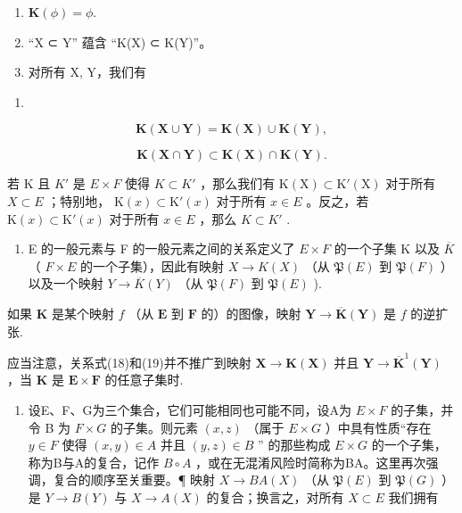 \begin{enumerate}
\def\labelenumi{(\alph{enumi})}
\item
  \(\mathbf{K}(\phi)=\phi.\)
\item
  “X ⊂ Y” 蕴含 “K(X) ⊂ K(Y)”。
\item
  对所有 X, Y，我们有
\end{enumerate}

\begin{enumerate}
\def\labelenumi{(\arabic{enumi})}
\setcounter{enumi}{27}
\tightlist
\item
\end{enumerate}

\[
\mathbf {K} (\mathbf {X} \cup \mathbf {Y}) = \mathbf {K} (\mathbf {X}) \cup \mathbf {K} (\mathbf {Y}),\tag{29}
\]

\[
\mathbf {K} (\mathbf {X} \cap \mathbf {Y}) \subset \mathbf {K} (\mathbf {X}) \cap \mathbf {K} (\mathbf {Y}).
\]

若 K 且 \(K'\) 是 \(E \times F\) 使得 \(K \subset K'\) ，那么我们有 \(\mathrm{K}(\mathrm{X}) \subset \mathrm{K}'(\mathrm{X})\) 对于所有 \(X \subset E\) ；特别地， \(\mathrm{K}(x) \subset \mathrm{K}'(x)\) 对于所有 \(x \in E\) 。反之，若 \(\mathrm{K}(x) \subset \mathrm{K}'(x)\) 对于所有 \(x \in E\) ，那么 \(K \subset K'\) .

\begin{enumerate}
\def\labelenumi{\arabic{enumi}.}
\setcounter{enumi}{8}
\tightlist
\item
  E 的一般元素与 F 的一般元素之间的关系定义了 \(E \times F\) 的一个子集 K 以及 \(\overline{K}\) （ \(F \times E\) 的一个子集），因此有映射 \(X \to K(X)\) （从 \(\mathfrak{P}(E)\) 到 \(\mathfrak{P}(F)\) ）以及一个映射 \(Y \to \overline{K}(Y)\) （从 \(\mathfrak{P}(F)\) 到 \(\mathfrak{P}(E)\) ).
\end{enumerate}

如果 \(\mathbf{K}\) 是某个映射 \(f\) （从 \(\mathbf{E}\) 到 \(\mathbf{F}\) 的）的图像，映射 \(\mathbf{Y} \to \overline{\mathbf{K}}(\mathbf{Y})\) 是 \(f\) 的逆扩张.

应当注意，关系式(18)和(19)并不推广到映射 \(\mathbf{X} \to \mathbf{K}(\mathbf{X})\) 并且 \(\mathbf{Y} \to \overline{\mathbf{K}}^{1}(\mathbf{Y})\) ，当 \(\mathbf{K}\) 是 \(\mathbf{E} \times \mathbf{F}\) 的任意子集时.

\begin{enumerate}
\def\labelenumi{\arabic{enumi}.}
\setcounter{enumi}{9}
\tightlist
\item
  设E、F、G为三个集合，它们可能相同也可能不同，设A为 \(E \times F\) 的子集，并令 B 为 \(F \times G\) 的子集。则元素 \((x, z)\) （属于 \(E \times G\) ）中具有性质“存在 \(y \in F\) 使得 \((x, y) \in A\) 并且 \((y, z) \in B\) '' 的那些构成 \(E \times G\) 的一个子集，称为B与A的复合，记作 \(B \circ A\) ，或在无混淆风险时简称为BA。这里再次强调，复合的顺序至关重要。¶ 映射 \(X \to BA(X)\) （从 \(\mathfrak{P}(E)\) 到 \(\mathfrak{P}(G)\) ）是 \(Y \to B(Y)\) 与 \(X \to A(X)\) 的复合；换言之，对所有 \(X \subset E\) 我们拥有
\end{enumerate}

